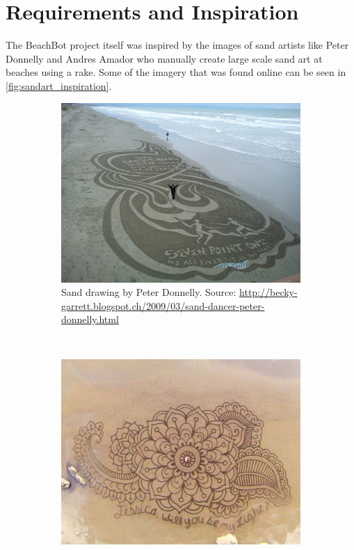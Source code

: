 \section{Requirements and Inspiration}

The BeachBot project itself was inspired by the images of sand artists like Peter Donnelly and Andres Amador who manually create large scale sand art at beaches using a rake. Some of the imagery that was found online can be seen in \autoref{fig:sandart_inspiration}.

\begin{figure}
\centering
\begin{subfigure}[c]{1\textwidth}
\includegraphics[width=\textwidth]{images/requirements_inspiration/donnelly_1.jpg} 
\caption{Sand drawing by Peter Donnelly. Source: \url{http://becky-garrett.blogspot.ch/2009/03/sand-dancer-peter-donnelly.html}}
\end{subfigure}
\\
\begin{subfigure}[b]{0.46\textwidth}
\includegraphics[width=\textwidth]{images/requirements_inspiration/andres_armador_1.jpg} 

\end{subfigure}
\end{figure}
